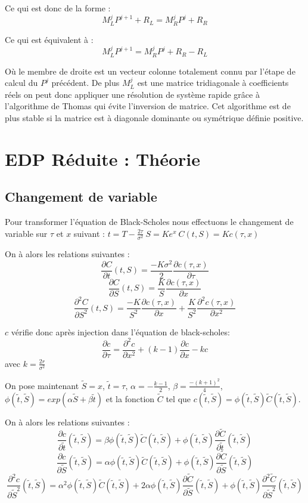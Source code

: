 \documentclass[11pt,a4paper]{article}
\begin{document}
Ce qui est donc de la forme :
\[ M_{L}^j P^{j+1} + R_{L} = M_{R}^j P^j + R_{R}\]

Ce qui est équivalent à :
\[ M_{L}^j P^{j+1} = M_{R}^j P^j + R_{R} - R_{L}\]

Où le membre de droite est un vecteur colonne totalement connu par l'étape de calcul du $P^j$ précédent. De plus $M_{L}^j$ est une matrice tridiagonale à coefficients réels on peut donc appliquer une résolution de système rapide grâce à l'algorithme de Thomas qui évite l'inversion de matrice. Cet algorithme est de plus stable si la matrice est à diagonale dominante ou symétrique définie positive.

\section{EDP Réduite : Théorie}
\subsection{Changement de variable}
Pour transformer l'équation de Black-Scholes nous effectuons le changement de variable sur $\tau$ et $x$ suivant : $t = T - \frac{2\tau}{\sigma^2} ~ S = Ke^x ~ C(t,S) = Kc(\tau,x)$

On à alors les relations suivantes :
\[\frac{\partial C}{\partial t}(t,S) = \frac{-K\sigma^2}{2} \frac{\partial c(\tau,x)}{\partial \tau}\]
\[\frac{\partial C}{\partial S}(t,S) = \frac{K}{S} \frac{\partial c(\tau,x)}{\partial x}\]
\[\frac{\partial^2 C}{\partial S^2}(t,S) = \frac{-K}{S^2} \frac{\partial c(\tau,x)}{\partial x} + \frac{K}{S^2} \frac{\partial^2 c(\tau,x)}{\partial x^2}\]

$c$ vérifie donc après injection dans l'équation de black-scholes:
\begin{equation}
	\frac{\partial c}{\partial \tau} = \frac{\partial^2 c}{\partial x^2} + (k - 1) \frac{\partial c}{\partial x} - kc
 \end{equation} 
avec $k = \frac{2r}{\sigma^2}$
 
On pose maintenant $\tilde{S} = x$, $\tilde{t} = \tau$, $\alpha = -\frac{k-1}{2}$, $\beta = \frac{-(k+1)^2}{4}$, $\phi(\tilde{t}, \tilde{S}) = exp(\alpha \tilde{S} + \beta \tilde{t})$ et la fonction $\tilde{C}$ tel que $c(\tilde{t}, \tilde{S}) = \phi(\tilde{t}, \tilde{S}) \tilde{C}(\tilde{t}, \tilde{S})$.

On à alors les relations suivantes :
\[\frac{\partial c}{\partial \tilde{t}}(\tilde{t}, \tilde{S}) = \beta \phi(\tilde{t}, \tilde{S}) \tilde{C}(\tilde{t}, \tilde{S}) + \phi(\tilde{t}, \tilde{S})\frac{\partial \tilde{C}}{\partial \tilde{t}}(\tilde{t}, \tilde{S}) \]
\[\frac{\partial c}{\partial \tilde{S}}(\tilde{t}, \tilde{S}) = \alpha \phi(\tilde{t}, \tilde{S}) \tilde{C}(\tilde{t}, \tilde{S}) + \phi(\tilde{t}, \tilde{S})\frac{\partial \tilde{C}}{\partial \tilde{S}}(\tilde{t}, \tilde{S}) \]
\[\frac{\partial^2 c}{\partial \tilde{S}^2}(\tilde{t}, \tilde{S}) = \alpha^2 \phi(\tilde{t}, \tilde{S}) \tilde{C}(\tilde{t}, \tilde{S}) + 2\alpha \phi(\tilde{t}, \tilde{S}) \frac{\partial \tilde{C}}{\partial \tilde{S}}(\tilde{t}, \tilde{S}) + \phi(\tilde{t}, \tilde{S})\frac{\partial^2 \tilde{C}}{\partial \tilde{S}^2}(\tilde{t}, \tilde{S}) \]
\end{document}
